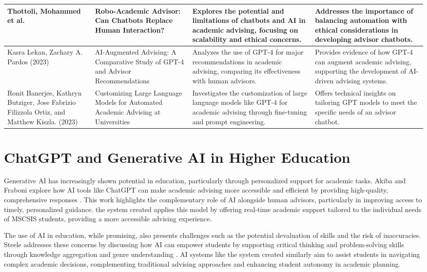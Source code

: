 \documentclass[12pt,oneside,openany]{report}
\begin{document}
\begin{longtable}{|p{2.5cm}|p{4.5cm}|p{4cm}|p{4cm}|}
Thottoli, Mohammed et al. & Robo-Academic Advisor: Can Chatbots Replace Human Interaction? & Explores the potential and limitations of chatbots and AI in academic advising, focusing on scalability and ethical concerns.\cite{thottoli2024robo} & Addresses the importance of balancing automation with ethical considerations in developing advisor chatbots. \\ \hline
Kasra Lekan, Zachary A. Pardos (2023) & AI-Augmented Advising: A Comparative Study of GPT-4 and Advisor Recommendations & Analyzes the use of GPT-4 for major recommendations in academic advising, comparing its effectiveness with human advisors.\cite{lekan2024aiaugmented} & Provides evidence of how GPT-4 can augment academic advising, supporting the development of AI-driven advising systems. \\ \hline
Ronit Banerjee, Kathryn Butziger, Jose Fabrizio Filizzola Ortiz, and
Matthew Kiszla. (2023) & Customizing Large Language Models for Automated Academic Advising at Universities & Investigates the customization of large language models like GPT-4 for academic advising through fine-tuning and prompt engineering.\cite{banerjee_2024} & Offers technical insights on tailoring GPT models to meet the specific needs of an advisor chatbot. \\ \hline

\end{longtable}


\section{ChatGPT and Generative AI in Higher Education}

Generative AI has increasingly shown potential in education, particularly through personalized support for academic tasks. Akiba and Fraboni explore how AI tools like ChatGPT can make academic advising more accessible and efficient by providing high-quality, comprehensive responses \cite{educsci13090885}. This work highlights the complementary role of AI alongside human advisors, particularly in improving access to timely, personalized guidance\cite{educsci13090885}. the system created applies this model by offering real-time academic support tailored to the individual needs of MSCSIS students, providing a more accessible advising experience.

The use of AI in education, while promising, also presents challenges such as the potential devaluation of skills and the risk of inaccuracies. Steele  addresses these concerns by discussing how AI can empower students by supporting critical thinking and problem-solving skills through knowledge aggregation and genre understanding \cite{STEELE2023100160}. AI systems like the system created similarly aim to assist students in navigating complex academic decisions, complementing traditional advising approaches and enhancing student autonomy in academic planning.
\end{document}
